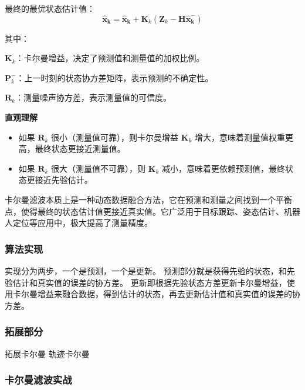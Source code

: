 \begin{enumerate}
    最终的最优状态估计值：
    \begin{equation}
        \mathbf{\hat{x}_{k}} = \mathbf{\hat{x}_{k}} + \mathbf{K}_k (\mathbf{Z}_k - \mathbf{H} \mathbf{\hat{x}_k^-})
    \end{equation}

    其中：

    $\mathbf{K}_k$：卡尔曼增益，决定了预测值和测量值的加权比例。

    $\mathbf{P}_{k}^-$：上一时刻的状态协方差矩阵，表示预测的不确定性。

    $\mathbf{R}_k$：测量噪声协方差，表示测量值的可信度。

\end{enumerate}

\textbf{直观理解}
\begin{itemize}
    \item 如果 $\mathbf{R}_k$ 很小（测量值可靠），则卡尔曼增益 $\mathbf{K}_k$ 增大，意味着测量值权重更高，最终状态更接近测量值。
    \item 如果 $\mathbf{R}_k$ 很大（测量值不可靠），则 $\mathbf{K}_k$ 减小，意味着更依赖预测值，最终状态更接近先验估计。
\end{itemize}

卡尔曼滤波本质上是一种动态数据融合方法，它在预测和测量之间找到一个平衡点，使得最终的状态估计值更接近真实值。它广泛用于目标跟踪、姿态估计、机器人定位等应用中，极大提高了测量精度。

\subsubsection{算法实现}
实现分为两步，一个是预测，一个是更新。
预测部分就是获得先验的状态，和先验估计和真实值的误差的协方差。
更新即根据先验状态方差更新卡尔曼增益，使用卡尔曼增益来融合数据，得到估计的状态，再去更新估计值和真实值的误差的协方差。

\subsubsection{拓展部分}
拓展卡尔曼
轨迹卡尔曼

\subsubsection{卡尔曼滤波实战}
